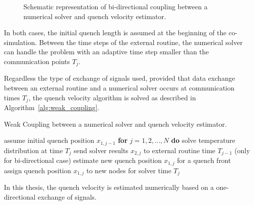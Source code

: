 \begin{figure}[H]
\centering
{}
\caption{Schematic representation of bi-directional coupling between a numerical solver and quench velocity estimator.}
\label{fig:bidirectional_coupling_scheme}
\end{figure}

In both cases, the initial quench length is assumed at the beginning of the co-simulation. Between the time steps of the external routine, the numerical solver can handle the problem with an adaptive time step smaller than the communication points $T_j$.

Regardless the type of exchange of signals used, provided that data exchange between an external routine and a numerical solver occurs at communication times $T_j$, the quench velocity algorithm is solved as described in Algorithm~\ref{alg:weak_coupling}.

\begin{algorithm}
  \caption{Weak Coupling between a numerical solver and quench velocity estimator.}
  \label{alg:weak_coupling}
  \begin{algorithmic}[1]
    \STATE assume initial quench position $x_{1,j-1}$ 
    \STATE \textbf{for} $j=1,2,...,N$ \textbf{do}
    \STATE \hspace{0.5cm} solve temperature distribution at time $T_j$
    \STATE \hspace{0.5cm} send solver results $x_{2,j}$ to external routine time $T_{j-1}$ (only for bi-directional case)
    \STATE \hspace{0.5cm} estimate new quench position $x_{1,j}$ for a quench front
    \STATE \hspace{0.5cm} assign quench position $x_{1,j}$ to new nodes for solver time  $T_j$
  \end{algorithmic}
\end{algorithm}

In this thesis, the quench velocity is estimated numerically based on a one-directional exchange of signals.
